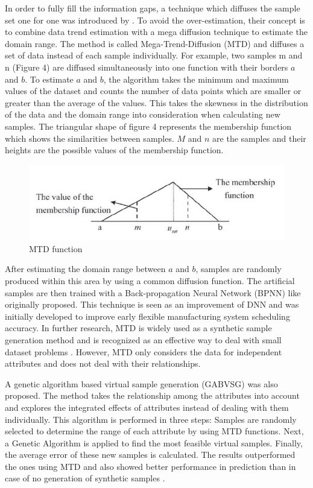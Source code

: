 \documentclass[parskip=full]{scrartcl}
\begin{document}
In order to fully fill the information gaps, a technique which diffuses the
sample set one for one was introduced by \cite{Li.2007}. To avoid the
over-estimation, their concept is to combine data trend estimation with a mega
diffusion technique to estimate the domain range. The method is called
Mega-Trend-Diffusion (MTD) and diffuses a set of data instead of each sample
individually. For example, two samples m and n (Figure 4) are diffused
simultaneously into one function with their borders $\mathit{a}$ and $\mathit{b}$. To estimate $\mathit{a}$ and $\mathit{b}$, the algorithm takes the minimum and maximum values of the dataset and counts the number of data points which are smaller or greater than the average of the values. This takes the skewness in the distribution of the data and the domain range into consideration when calculating new samples. The triangular shape of figure 4 represents the membership function which shows the similarities between samples. $\mathit{M}$ and $\mathit{n}$ are the samples and their heights are the possible values of the membership function.

\begin{figure}[H]
	\centering
	\includegraphics[width=0.7\linewidth]{"./Resources/mtd_function"}
	\caption{MTD function}
	\label{fig:mtd-function}
\end{figure}

After estimating the domain range between $\mathit{a}$ and $\mathit{b}$, samples are randomly produced within this area by using a common diffusion function. The artificial samples are then trained with a Back-propagation Neural Network (BPNN) like \cite{Huang.2004} originally proposed. This technique is seen as an improvement of DNN and was initially developed to improve early flexible manufacturing system scheduling accuracy. In further research, MTD is widely used as a synthetic sample generation method and is recognized as an effective way to deal with small dataset problems \cite{AbdulLateh.2017}. However, MTD only considers the data for independent attributes and does not deal with their relationships. 

A genetic algorithm based virtual sample generation (GABVSG) was also proposed. 
The method takes the relationship among the attributes into account and 
explores the integrated effects of attributes instead of dealing with them 
individually. This algorithm is performed in three steps: Samples are randomly 
selected to determine the range of each attribute by using MTD functions. Next, 
a Genetic Algorithm is applied to find the most feasible virtual samples. 
Finally, the average error of these new samples is calculated. The results 
outperformed the ones using MTD and also showed better performance in 
prediction than in case of no generation of synthetic samples \cite{Li.2014}.
\end{document}
